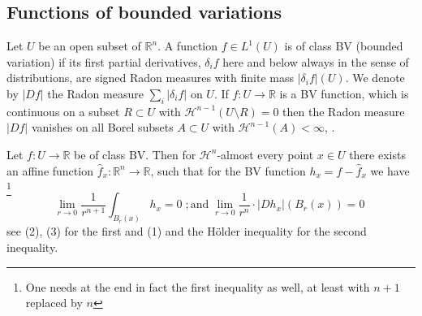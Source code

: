 \documentclass[12pt,leqno,intlimits]{amsart}
\numberwithin{equation}{section}
\theoremstyle{definition}
\theoremstyle{remark}
\newtheorem{rem}[thm]{Remark}
\newcommand{\R}{\mathbb{R}}
\def\co{\colon\thinspace}
\begin{document}

\subsection{Functions of bounded variations}
Let $U$ be an open subset of $\R^n$. A function $f\in L^1 (U)$ is of class  BV (bounded variation) if its first partial derivatives, $\delta _i f$ here and below always in the sense of distributions, are signed Radon measures with finite mass $|\delta _i f |(U)$. We denote by $|Df|$ the Radon measure $\sum_i |\delta _i f|$ on $U$.  If $f:U\to \R$ is a BV function, which is continuous on a subset $R \subset U$ with $\mathcal H^{n-1} (U\setminus R)=0$ then the Radon measure $|Df|$ vanishes on all Borel subsets $A\subset U$ with $\mathcal H^{n-1} (A)<\infty$, \cite{Goffmann}.

Let $f:U\to \R$ be of class BV.  Then  for $\mathcal H^n$-almost every point
$x\in U$ there exists an affine  function $\hat f _x:\R^n\to \R$, such that for the BV function $h_x=f-\hat f_x$  we have \footnote{\color{blue} One needs at the end  in fact the first inequality as well, at least with $n+1$ replaced by $n$}
\begin{equation}\label{DC-ae-diff}
\lim_{r\to 0}\frac 1 {r^{n+1}}  \int _{B_r(x)} h_x =0 \; ; \text{and} \;     \lim _{r\to 0}  \frac 1 {r^n} \cdot   |Dh_x| (B_r (x)) =0 \;
\end{equation}
see \cite[ Theorem 6.1]{Evans} (2), (3) for the first and (1) and the H\"older inequality for the second inequality.

\end{document}
